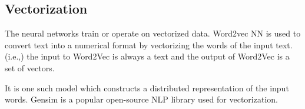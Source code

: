 \subsection{Vectorization}

The neural networks train or operate on vectorized data. \cite{InfosysNLP:1} Word2vec NN is used to convert text into a numerical format by vectorizing the words of the input text. (i.e.,) the input to Word2Vec is always a text and the output of Word2Vec is a set of vectors.

It is one such model which constructs a distributed representation of the input words.
Gensim is a popular open-source NLP library used for vectorization.
